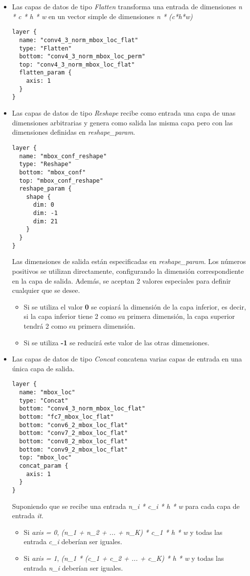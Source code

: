 \documentclass[a4paper, 12pt, spanish, chapterprefix, numbers=noenddot]{book}
\begin{document}
\begin{itemize}
\item Las capas de datos de tipo \textit{Flatten} transforma una entrada de dimensiones \textit{n * c * h * w} en un vector simple de dimensiones \textit{n * (c*h*w)}\\
\begin{lstlisting}[frame=single]
layer {
  name: "conv4_3_norm_mbox_loc_flat"
  type: "Flatten"
  bottom: "conv4_3_norm_mbox_loc_perm"
  top: "conv4_3_norm_mbox_loc_flat"
  flatten_param {
    axis: 1
  }
}
\end{lstlisting}
\item Las capas de datos de tipo \textit{Reshape} recibe como entrada una capa de unas dimensiones arbitrarias y genera como salida las misma capa pero con las dimensiones definidas en \textit{reshape\_param}.\\
\begin{lstlisting}[frame=single]
layer {
  name: "mbox_conf_reshape"
  type: "Reshape"
  bottom: "mbox_conf"
  top: "mbox_conf_reshape"
  reshape_param {
    shape {
      dim: 0
      dim: -1
      dim: 21
    }
  }
}
\end{lstlisting}

Las dimensiones de salida están especificadas en \textit{reshape\_param}. Los números positivos se utilizan directamente, configurando la dimensión correspondiente en la capa de salida. Además, se aceptan 2 valores especiales para definir cualquier que se desee.

\begin{itemize}
\item Si se utiliza el valor \textbf{0} se copiará la dimensión de la capa inferior, es decir, si la capa inferior tiene 2 como su primera dimensión, la capa superior tendrá 2 como su primera dimensión.
\item Si se utiliza \textbf{-1} se reducirá este valor de las otras dimensiones.
\end{itemize}
\item Las capas de datos de tipo \textit{Concat} concatena varias capas de entrada en una única capa de salida.\\
\begin{lstlisting}[frame=single]
layer {
  name: "mbox_loc"
  type: "Concat"
  bottom: "conv4_3_norm_mbox_loc_flat"
  bottom: "fc7_mbox_loc_flat"
  bottom: "conv6_2_mbox_loc_flat"
  bottom: "conv7_2_mbox_loc_flat"
  bottom: "conv8_2_mbox_loc_flat"
  bottom: "conv9_2_mbox_loc_flat"
  top: "mbox_loc"
  concat_param {
    axis: 1
  }
}
\end{lstlisting}
Suponiendo que se recibe una entrada \textit{n\_i * c\_i * h * w} para cada capa de entrada \textit{it}.
\begin{itemize}
\item Si \textit{axis = 0}, \textit{(n\_1 + n\_2 + ... + n\_K) * c\_1 * h * w} y todas las entrada \textit{c\_i} deberían ser iguales.
\item Si \textit{axis = 1}, \textit{(n\_1 * (c\_1 + c\_2 + ... + c\_K) * h * w} y todas las entrada \textit{n\_i} deberían ser iguales.
\end{itemize}
\end{itemize}
\end{document}
